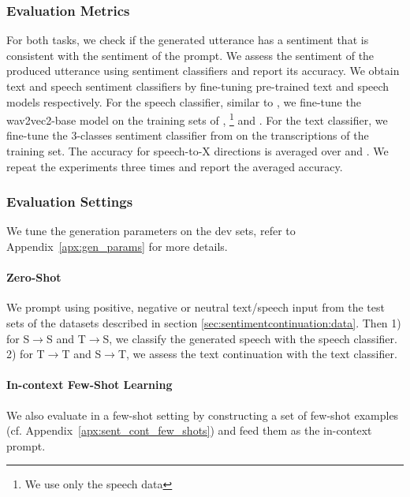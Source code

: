 \subsubsection{Evaluation Metrics}
For both tasks, we check if the generated utterance has a sentiment that is consistent with the sentiment of the prompt. We assess the sentiment of the produced utterance using sentiment classifiers and report its accuracy. We obtain text and speech sentiment classifiers by fine-tuning pre-trained text and speech models respectively. For the speech classifier, similar to \citet{nguyen2023expresso}, we fine-tune the wav2vec2-base model \citep{baevski2020w2v2}
on the training sets of \expressoread, \expressoasr\footnote{We use only the speech data} and \emov. For the text classifier, we fine-tune the 3-classes sentiment classifier from \citet{hartmann2021} on the transcriptions of the \expressoasr training set. The accuracy for speech-to-X directions is averaged over \expressoread and \emov. We repeat the experiments three times and report the averaged accuracy.
\label{sec:sent_cont_eval}

\subsubsection{Evaluation Settings}
We tune the generation parameters on the dev sets, refer to Appendix~\ref{apx:gen_params} for more details.
\paragraph{Zero-Shot}We prompt \spot using positive, negative or neutral text/speech input from the test sets of the datasets described in section \ref{sec:sentimentcontinuation:data}. Then 1) for S$\rightarrow$S and T$\rightarrow$S, we classify the generated speech with the speech classifier. 2) for T$\rightarrow$T and S$\rightarrow$T, we assess the text continuation with the text classifier.

\paragraph{In-context Few-Shot Learning } We also evaluate \spot in a few-shot setting by constructing a set of few-shot examples (cf. Appendix~\ref{apx:sent_cont_few_shots}) and feed them as the in-context prompt. 

